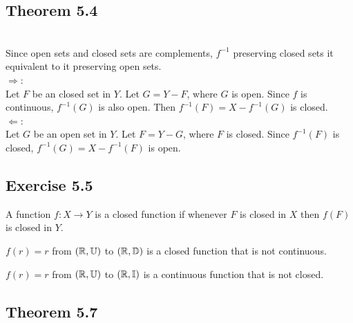 \subsection{Theorem 5.4}
\setcounter{question}{0}


\begin{solution}
 \\Since open sets and closed sets are complements, $f^{-1}$ preserving closed sets it equivalent to it preserving open sets. \\
 $\Rightarrow$: \\
 Let $F$ be an closed set in $Y$. Let $G = Y - F$, where $G$ is open. Since $f$ is continuous, $f^{-1}(G)$ is also open. Then $f^{-1}(F) = X - f^{-1}(G)$ is closed. \\
 $\Leftarrow$: \\
 Let $G$ be an open set in $Y$. Let $F = Y - G$, where $F$ is closed. Since $f^{-1}(F)$ is closed, $f^{-1}(G) = X - f^{-1}(F)$ is open. \\
\end{solution}

\subsection{Exercise 5.5}
\setcounter{question}{0}

A function $f: X \rightarrow Y$ is a closed function if whenever $F$ is closed in $X$ then $f(F)$ is closed in $Y$.


\begin{solution}
 $f(r) = r$ from $(\mathbb{R}, \mathbb{U})$ to $(\mathbb{R}, \mathbb{D})$ is a closed function that is not continuous.
\end{solution}


\begin{solution}
 $f(r) = r$ from $(\mathbb{R}, \mathbb{U})$ to $(\mathbb{R}, \mathbb{I})$ is a continuous function that is not closed.
\end{solution}

\subsection{Theorem 5.7}
\setcounter{question}{0}

